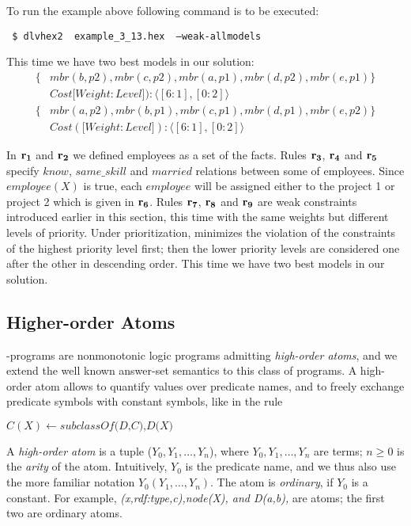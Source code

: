 \documentclass[a4paper, titlepage]{article}
\newcommand\mycenterline[1]{\par\smallskip\centerline{#1} \smallskip}
\newcommand\leftaligned[1]{\par \smallskip #1 \smallskip \par}
\newcommand{\row}[1]{%
  \ensuremath{\color{black}\ensuremath{\mathbf{#1}} \color{black}}%
}
\begin{document}
To run the example above following command is to be executed:
%
\leftaligned{\texttt{ \$ dlvhex2 \ example\_3\_13.hex \ --weak-allmodels}}
%
This time we have two best 
models in our solution:
\begin{align*}
\{ & \mathit{mbr}(b,p2), \mathit{mbr}(c,p2), 
   \mathit{mbr}(a,p1), \mathit{mbr}(d,p2), 
   \mathit{mbr}(e,p1) \} \\
   & \mathit{Cost} [ \mathit{Weight:Level]}):  \langle 
   [6:1],[0:2] \rangle \\ 
\{ & \mathit{mbr}(a,p2), \mathit{mbr}(b,p1), 
   \mathit{mbr}(c,p1), \mathit{mbr}(d,p1), 
   \mathit{mbr}(e,p2) \} \\
   & \mathit{Cost} ([ \mathit{Weight:Level]}):\langle 
   [6:1],[0:2] \rangle
\end{align*}

In $\row{r_1}$ and $\row{r_2}$ we defined employees as a set of the 
facts. Rules $\row{r_3}$, $\row{r_4}$ and $\row{r_5}$ specify $\mathit{know}$, 
$\mathit{same\_skill}$ and $\mathit{married}$ relations 
between some of employees. Since $\mathit{employee}(X)$ is 
true, each $\mathit{employee}$ will be assigned either to 
the project 1 or project 2 which is given in $\row{r_6}$. Rules $\row{r_7}$, $\row{r_8}$ and $\row{r_9}$ 
are weak constraints introduced earlier in this section, this time with the 
same weights but different levels of priority. Under 
prioritization, \dlvhex{} minimizes the violation of 
the constraints of the highest priority level first; then 
the lower priority levels are considered one after the 
other in descending order. This time we have two best 
models in our solution.     


\subsection{Higher-order Atoms}
\hex{}-programs are 
nonmonotonic logic programs admitting \emph{high-order 
atoms}, and we extend the well known answer-set semantics 
to this class of programs. A high-order 
atom allows to quantify values over predicate names, and to 
freely exchange predicate symbols with constant symbols, 
like in the rule
%
\mycenterline{$C(X) \leftarrow \textit{subclassOf(D,C),D(X)}$}
%
A \textit{high-order atom} is a tuple ($Y_0, Y_1,
\dots,Y_n$), where $Y_0, Y_1,\dots,Y_n$ are terms; $ n \ge 
0$ is the \textit{arity} of the atom. Intuitively, $Y_0$ 
is the predicate name, and we thus also use the more 
familiar notation $Y_0(Y_1,\dots,Y_n)$. The atom is 
\textit{ordinary}, if $Y_0$ is a constant. For example, 
\textit{(x,rdf:type,c),node(X), and D(a,b),} are atoms; the 
first two are ordinary atoms.
\end{document}

